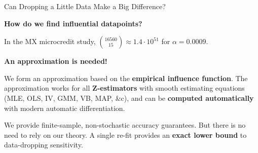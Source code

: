 %
%
%
%
%
%
%
%


\begin{frame}[t]{Can Dropping a Little Data Make a Big Difference?}

\textbf{How do we find influential datapoints?}

\vspace{1em}
In the MX microcredit study, ${16560 \choose 15} \approx 1.4 \cdot 10^{51}$
for $\alpha = 0.0009$.

\vspace{1em}
\textbf{An approximation is needed!}

\pause
\vspace{1em} We form an approximation based on the \textbf{empirical influence
function}. The approximation works for all \textbf{Z-estimators} with smooth
estimating equations (MLE, OLS, IV, GMM, VB, MAP, \&c), and can be
\textbf{computed automatically} with modern automatic differentiation.

\pause
\vspace{1em}
We provide finite-sample, non-stochastic accuracy guarantees.  But
there is no need to rely on our theory.  A single re-fit provides an
\textbf{exact lower bound} to data-dropping sensitivity.

\end{frame}



